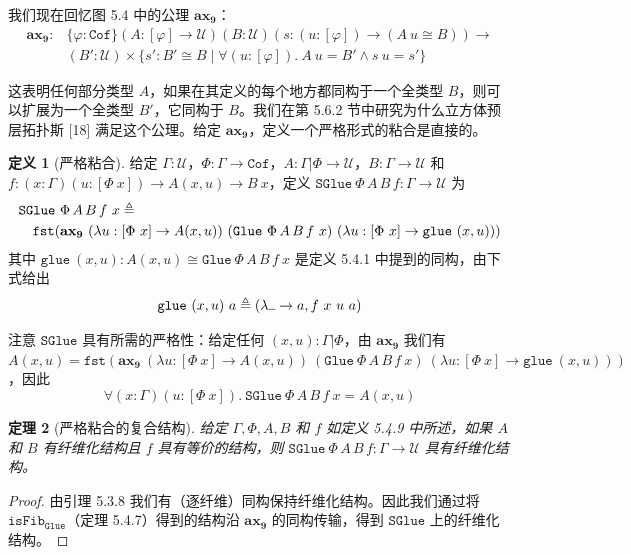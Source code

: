 \documentclass{ctexrep}
\theoremstyle{plain}
\newtheorem{theorem}{定理}[section]
\theoremstyle{definition}
\newtheorem{definition}[theorem]{定义}
\theoremstyle{remark}
\newcommand{\ax}[1]{\mathbf{ax_{#1}}}
\newcommand{\ul}{{\rule[0ex]{0.5em}{0.4pt}}} %
\begin{document}
我们现在回忆图 5.4 中的公理 $\ax{9}$：
\begin{align*}
\ax{9} : &\{\varphi : \mathtt{Cof}\}(A : [\varphi] \to \mathcal{U})(B : \mathcal{U})(s : (u : [\varphi]) \to (A\ u \cong B)) \to\\
&(B' : \mathcal{U}) \times \{s' : B' \cong B \mid \forall(u : [\varphi]).\ A\ u = B' \land s\ u = s'\}
\end{align*}

这表明任何部分类型 $A$，如果在其定义的每个地方都同构于一个全类型 $B$，则可以扩展为一个全类型 $B'$，它同构于 $B$。我们在第 5.6.2 节中研究为什么立方体预层拓扑斯 [18] 满足这个公理。给定 $\ax{9}$，定义一个严格形式的粘合是直接的。

\begin{definition}[严格粘合]
给定 $\Gamma : \mathcal{U}$，$\Phi : \Gamma \to \mathtt{Cof}$，$A : \Gamma|\Phi \to \mathcal{U}$，$B : \Gamma \to \mathcal{U}$ 和 $f : (x : \Gamma)(u : [\Phi\ x]) \to A(x, u) \to B\ x$，定义 $\mathtt{SGlue}\ \Phi\,A\,B\,f : \Gamma \to \mathcal{U}$ 为
\begin{align}
&\mathtt{SGlue}\ \Phi\,A\,B\,f\ x \triangleq\notag\\
&\quad\mathtt{fst}(\ax{9}\ (\lambda u : [\Phi\ x] \to A(x, u))\ (\mathtt{Glue}\ \Phi\,A\,B\,f\ x)\ (\lambda u : [\Phi\ x] \to \mathtt{glue}\ (x, u)))
\end{align}
其中 $\mathtt{glue}\ (x, u) : A(x, u) \cong \mathtt{Glue}\ \Phi\,A\,B\,f\ x$ 是定义 5.4.1 中提到的同构，由下式给出
\[
\mathtt{glue}\ (x, u)\ a \triangleq (\lambda\ul  \to a, f\ x\ u\ a)
\]

注意 $\mathtt{SGlue}$ 具有所需的严格性：给定任何 $(x, u) : \Gamma|\Phi$，由 $\ax{9}$ 我们有 $A(x, u) = \mathtt{fst}(\ax{9}\ (\lambda u : [\Phi\ x] \to A(x, u))\ (\mathtt{Glue}\ \Phi\,A\,B\,f\ x)\ (\lambda u : [\Phi\ x] \to \mathtt{glue}\ (x, u)))$，因此
\begin{equation}
\forall(x : \Gamma)(u : [\Phi\ x]).\ \mathtt{SGlue}\ \Phi\,A\,B\,f\ x = A(x, u)
\end{equation}
\end{definition}

\begin{theorem}[严格粘合的复合结构]
给定 $\Gamma, \Phi, A, B$ 和 $f$ 如定义 5.4.9 中所述，如果 $A$ 和 $B$ 有纤维化结构且 $f$ 具有等价的结构，则 $\mathtt{SGlue}\ \Phi\,A\,B\,f : \Gamma \to \mathcal{U}$ 具有纤维化结构。
\end{theorem}

\begin{proof}
由引理 5.3.8 我们有（逐纤维）同构保持纤维化结构。因此我们通过将 $\mathtt{isFib}_{\mathtt{Glue}}$（定理 5.4.7）得到的结构沿 $\ax{9}$ 的同构传输，得到 $\mathtt{SGlue}$ 上的纤维化结构。
\end{proof}
\end{document}
